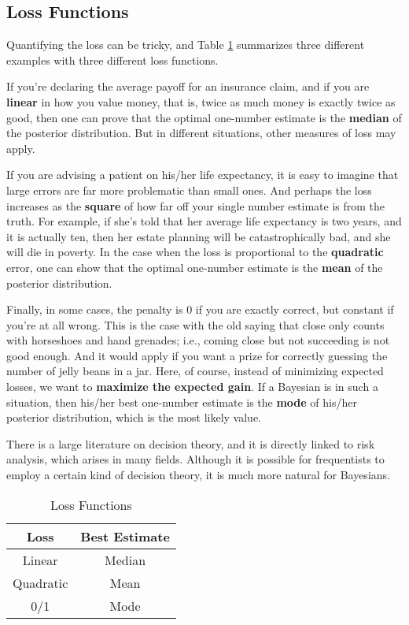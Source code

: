 \documentclass[]{book}
\theoremstyle{definition}
\theoremstyle{definition}
\theoremstyle{definition}
\theoremstyle{remark}
\begin{document}
\subsection{Loss Functions}\label{loss-functions}

Quantifying the loss can be tricky, and Table \ref{tab:loss-functions}
summarizes three different examples with three different loss functions.

If you're declaring the average payoff for an insurance claim, and if
you are \textbf{linear} in how you value money, that is, twice as much
money is exactly twice as good, then one can prove that the optimal
one-number estimate is the \textbf{median} of the posterior
distribution. But in different situations, other measures of loss may
apply.

If you are advising a patient on his/her life expectancy, it is easy to
imagine that large errors are far more problematic than small ones. And
perhaps the loss increases as the \textbf{square} of how far off your
single number estimate is from the truth. For example, if she's told
that her average life expectancy is two years, and it is actually ten,
then her estate planning will be catastrophically bad, and she will die
in poverty. In the case when the loss is proportional to the
\textbf{quadratic} error, one can show that the optimal one-number
estimate is the \textbf{mean} of the posterior distribution.

Finally, in some cases, the penalty is 0 if you are exactly correct, but
constant if you're at all wrong. This is the case with the old saying
that close only counts with horseshoes and hand grenades; i.e., coming
close but not succeeding is not good enough. And it would apply if you
want a prize for correctly guessing the number of jelly beans in a jar.
Here, of course, instead of minimizing expected losses, we want to
\textbf{maximize the expected gain}. If a Bayesian is in such a
situation, then his/her best one-number estimate is the \textbf{mode} of
his/her posterior distribution, which is the most likely value.

There is a large literature on decision theory, and it is directly
linked to risk analysis, which arises in many fields. Although it is
possible for frequentists to employ a certain kind of decision theory,
it is much more natural for Bayesians.

\begin{table}

\caption{\label{tab:loss-functions}Loss Functions}
\centering
\begin{tabular}[t]{cc}
\toprule
Loss & Best Estimate\\
\midrule
Linear & Median\\
Quadratic & Mean\\
0/1 & Mode\\
\bottomrule
\end{tabular}
\end{table}
\end{document}
